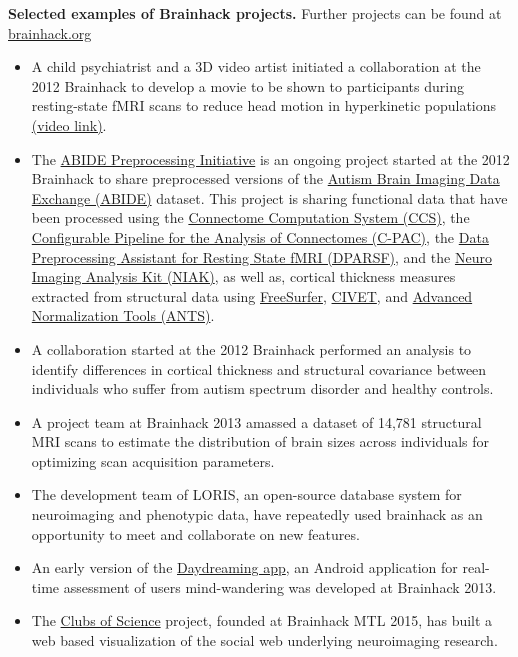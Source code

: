 \begin{table}[!ht]
\caption{{\bf Selected examples of Brainhack projects.} Further projects can be found at \href{http://www.brainhack.org}{brainhack.org}\label{tab3}}
\hline
    \begin{itemize}
    \item 
        A child psychiatrist and a 3D video artist initiated a collaboration at the 2012 Brainhack to develop a movie to be shown to participants during resting-state fMRI scans to reduce head motion in hyperkinetic populations \href{http://vimeo.com/67962604}{(video link)}\cite{vanderwal2015}.
    \item 
        The \href{http://preprocessed-connectomes-project.github.io/abide}{ABIDE Preprocessing Initiative} is an ongoing project started at the 2012 Brainhack to share preprocessed versions of the \href{http://fcon_1000.projects.nitrc.org/indi/abide}{Autism Brain Imaging Data Exchange (ABIDE)} dataset. This project is sharing functional data that have been processed using the \href{http://lfcd.psych.ac.cn/ccs.html}{Connectome Computation System (CCS)}, the \href{http://fcp-indi.github.io}{Configurable Pipeline for the Analysis of Connectomes (C-PAC)}, the \href{http://rfmri.org/DPARSF}{Data Preprocessing Assistant for Resting State fMRI (DPARSF)}, and the \href{https://www.nitrc.org/projects/niak/}{Neuro Imaging Analysis Kit (NIAK)}, as well as, cortical thickness measures extracted from structural data using \href{http://freesurfer.net/}{FreeSurfer}, \href{http://www.bic.mni.mcgill.ca/ServicesSoftware/CIVET}{CIVET}, and \href{http://picsl.upenn.edu/software/ants/}{Advanced Normalization Tools (ANTS)}.
    \item
        A collaboration started at the 2012 Brainhack performed an analysis to identify differences in cortical thickness and structural covariance between individuals who suffer from autism spectrum disorder and healthy controls\cite{Valk2015}.
    \item
        A project team at Brainhack 2013 amassed a dataset of 14,781 structural MRI scans to estimate the distribution of brain sizes across individuals for optimizing scan acquisition parameters\cite{Mennes2014}.
    \item 
        The development team of LORIS, an open-source database system for neuroimaging and phenotypic data, have repeatedly used brainhack as an opportunity to meet and collaborate on new features\cite{Das2012}.
    \item
        An early version of the \href{http://daydreaming-the-app.net}{Daydreaming app}, an Android application for real-time assessment of users mind-wandering was developed at Brainhack 2013.
    \item 
        The \href{http://dery.xyz/projects/templates/clubsofscience.html}{Clubs of Science} project, founded at Brainhack MTL 2015, has built a web based visualization of the social web underlying neuroimaging research.
    \end{itemize}
\hline
\end{table}
